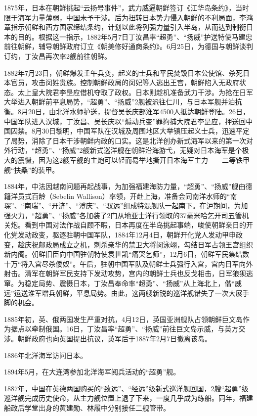 \documentclass[12pt,UTF8]{ctexbook}
\begin{document}
1875年，日本在朝鲜挑起“云扬号事件”，武力威逼朝鲜签订《江华岛条约》，当时限于海军力量薄弱，中国未予干涉。后为扭转日本势力侵入朝鲜的不利局面，李鸿章指示朝鲜和西方国家缔结条约，计划以此将列强力量引入半岛，从而达到制衡日本的目的。根据这一指示，1882年5月7日丁汝昌率“超勇”、“扬威”护送特使马建忠前往朝鲜，辅导朝鲜政府订立《朝美修好通商条约》。6月25日，为德国与朝鲜谈判订约，丁汝昌再次率2舰前往朝鲜。

1882年7月23日，朝鲜爆发壬午兵变，起义的士兵和平民焚毁日本公使馆、杀死日本官员，攻击闵姓贵族。控制朝鲜政局的闵妃等人逃出王宫，朝鲜陷入无政府状态。太上皇大院君李昰应借机夺取了政权。日本则趁机准备武力干涉。为抢在日军大举进入朝鲜前平息局势，“超勇”、“扬威”2舰被派往仁川，与日本军舰并泊抗衡。8月20日，由北洋水师护送，提督吴长庆部淮军4500人抵达朝鲜登陆。26日，中国军队进入汉城，丁汝昌、吴长庆以“煽动兵变”罪拘捕大院君李昰应，押送回中国囚禁。8月30日黎明，中国军队在汉城及周围地区大举镇压起义士兵，迅速平定了局势，消除了日本干涉朝鲜内政的口实。这是北洋创办新式海军以来的第一次对外行动，“超勇”、“扬威”2艘新式巡洋舰在朝鲜沿海游弋，无疑对日本海军是个极大的震慑，因为这2艘军舰的主炮可以轻而易举地撕开日本海军主力——二等铁甲舰“扶桑”的装甲。

1884年，中法因越南问题再起战事，为加强福建海防力量，“超勇”、“扬威”舰由德籍洋员式百龄（Sebelin Wallison）率领，开赴上海，准备会同南洋水师的“南琛”、“南瑞”、“开济”、“澄庆”、“驭远”组成特混舰队一起南下。在沪期间，为加强火力，“超勇”、“扬威”各加装了2门从地亚士洋行领取的37毫米哈乞开司五管机关炮。看到中国对法作战自顾不暇，日本再度在半岛挑起事端，唆使朝鲜亲日的开化党发动政变，驱逐驻朝中国军队，1884年12月4日，朝鲜开化党人发动甲申政变，趁庆祝邮政局成立之机，刺杀亲华的禁卫大将闵泳翊，勾结日军占领王宫组织新内阁。朝鲜旧臣向中国驻朝特使袁世凯“痛哭乞师”，12月6日，朝鲜军民集结数十万“将入宫尽杀倭奴”。午后，驻朝中国军队及朝鲜士兵强行入宫，宫内日军向外射击。清军在朝鲜军民支持下发动攻势，宫内的朝鲜士兵也反戈相击，日军狼狈逃窜。为稳定局势、震慑日本，丁汝昌奉命率“超勇”、“扬威”从上海北上，偕“威远”运送淮军增兵朝鲜，平息局势。由此，这两艘新锐的巡洋舰错失了一次大展手脚的机会。

1885年初，英、俄两国发生严重对抗，4月12日，英国亚洲舰队占领朝鲜巨文岛作为据点以牵制俄国。16日，丁汝昌率“超勇”、“扬威”前往巨文岛示威，与英方交涉。朝鲜政府也向英国提出抗议，英军后于1887年2月7日撤离该岛。

1886年北洋海军访问日本。

1894年5月，在大连湾参加北洋海军阅兵活动的“超勇”舰。

1887年，中国在英德两国购买的“致远”、“经远”级新式巡洋舰回国，2艘“超勇”级巡洋舰完成历史使命，从主力舰位置上退了下来，一度几乎成为练船。同年，福建船政后学堂出身的黄建勋、林履中分别接任二舰管带。
\end{document}
